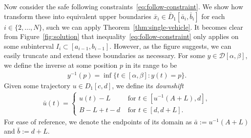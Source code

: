\documentclass[a4paper]{report}
\theoremstyle{definition}
\theoremstyle{plain}
\begin{document}
Now consider the safe following constraints~\eqref{eq:follow-constraint}.
%
We show how transform these into equivalent upper boundaries
$\bar{x}_{i} \in \bar{D}_{1}[\bar{a}_{i}, \bar{b}_{i}]$ for each
$i \in \{2, \dots, N\}$, such we can apply Theorem~\ref{thm:single-vehicle}.
%
It becomes clear from Figure~\ref{fig:solution} that
inequality~\eqref{eq:follow-constraint} only applies on some subinterval
$I_{i} \subset [a_{i-1}, b_{i-1}]$.
%
However, as the figure suggests, we can easily truncate and extend these
boundaries as necessary.
%
For some $y \in \mathcal{D}[\alpha, \beta]$, we define the inverse at some
position $p$ in its range to be
\begin{align}
  y^{-1}(p) = \inf \{ t \in [\alpha, \beta] : y(t) = p\} .
\end{align}
%
Given some trajectory $u \in D_{1}[c,d]$, we define its \emph{downshift}
%
\begin{align}
  \bar{u}(t) =
  \begin{cases}
    u(t) - L &\text{ for } t \in [u^{-1}(A + L), d] , \\
    B - L + t - d &\text{ for } t \in [d, d + L] .
  \end{cases}
\end{align}
For ease of reference, we denote the endpoints of its domain as
$\bar{a} := u^{-1}(A+L)$ and $\bar{b} := d + L$.
\end{document}
